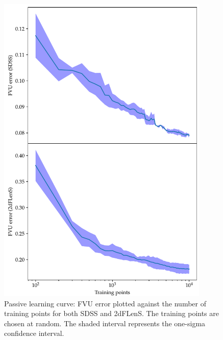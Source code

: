 \documentclass[11pt,twoside,openright]{report}
\begin{document}
  \begin{figure}
    \centering
    \includegraphics[width=0.9\textwidth]{passive_fvu.pdf}
    \caption{Passive learning curve: FVU error plotted against the number of training points for both SDSS and 2dFLenS. The training points are chosen at random. The shaded interval represents the one-sigma confidence interval.}
    \label{fig:passive_fvu}
  \end{figure}
\end{document}
